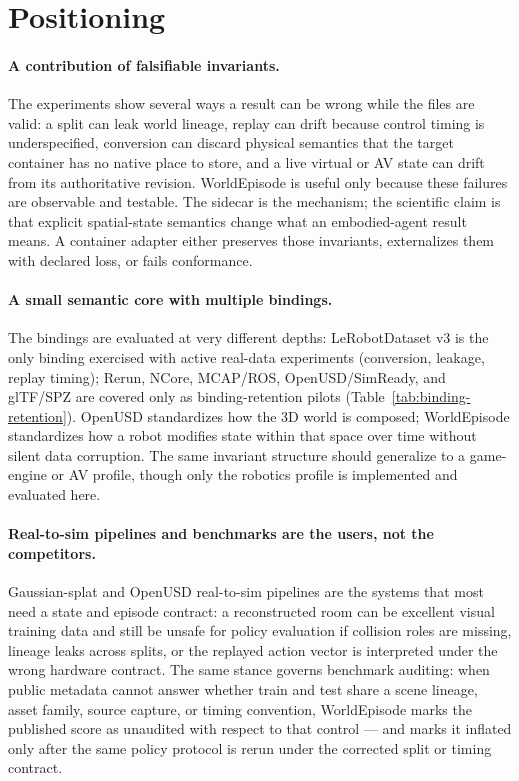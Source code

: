 \section{Positioning}
\label{sec:positioning}

\paragraph{A contribution of falsifiable invariants.}
The experiments show several ways a result can be wrong while the files are valid: a split can leak
world lineage, replay can drift because control timing is underspecified, conversion can discard
physical semantics that the target container has no native place to store, and a live virtual or AV
state can drift from its authoritative revision. WorldEpisode is useful only because these failures
are observable and testable. The sidecar is the mechanism; the scientific claim is that explicit
spatial-state semantics change what an embodied-agent result means. A container adapter either
preserves those invariants, externalizes them with declared loss, or fails conformance.

\paragraph{A small semantic core with multiple bindings.}
The bindings are evaluated at very different depths: LeRobotDataset v3 is the only binding
exercised with active real-data experiments (conversion, leakage, replay timing); Rerun, NCore,
MCAP/ROS, OpenUSD/SimReady, and glTF/SPZ are covered only as binding-retention pilots
(Table~\ref{tab:binding-retention}). OpenUSD standardizes how the 3D world is composed;
WorldEpisode standardizes how a robot modifies state within that space over time without silent
data corruption. The same invariant structure should generalize to a game-engine or AV profile,
though only the robotics profile is implemented and evaluated here.

\paragraph{Real-to-sim pipelines and benchmarks are the users, not the competitors.}
Gaussian-splat and OpenUSD real-to-sim pipelines are the systems that most need a state and episode
contract: a reconstructed room can be excellent visual training data and still be unsafe for policy
evaluation if collision roles are missing, lineage leaks across splits, or the replayed action
vector is interpreted under the wrong hardware contract. The same stance governs benchmark
auditing: when public metadata cannot answer whether train and test share a scene lineage, asset
family, source capture, or timing convention, WorldEpisode marks the published score as unaudited
with respect to that control --- and marks it inflated only after the same policy protocol is rerun
under the corrected split or timing contract.

